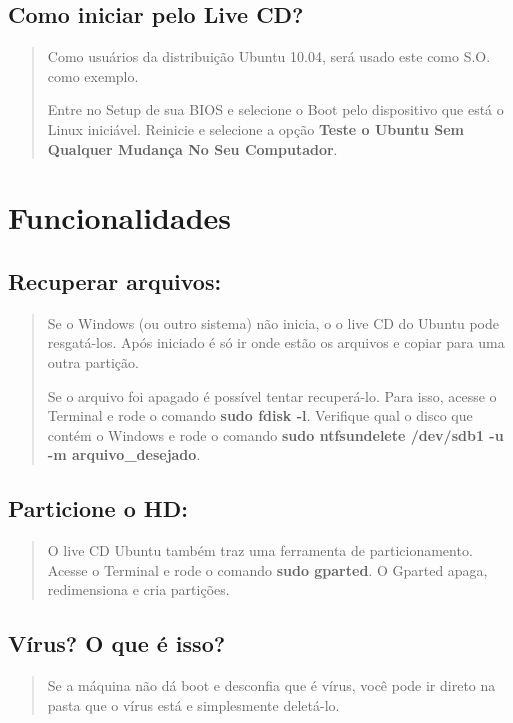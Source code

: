\documentclass[12pt, a4paper, tocpage=plain]{abnt} %
\begin{document}
\section{Como iniciar pelo Live CD?}

\begin{quote}
Como usuários da distribuição Ubuntu 10.04, será usado este como S.O. como exemplo.

Entre no Setup de sua BIOS e selecione o Boot pelo dispositivo que está o Linux iniciável. Reinicie e selecione a opção {\bf Teste o Ubuntu Sem Qualquer Mudança No Seu Computador}.
\end{quote}

\chapter{Funcionalidades}


\section{Recuperar arquivos:}

\begin{quote}
Se o Windows (ou outro sistema) não inicia, o o live CD do Ubuntu pode resgatá-los. Após iniciado é só ir onde estão os arquivos e copiar para uma outra partição. 

Se o arquivo foi apagado é possível tentar recuperá-lo. Para isso, acesse o Terminal e rode o comando  {\bf sudo fdisk -l}. Verifique qual o disco que contém o Windows e rode o comando {\bf sudo ntfsundelete /dev/sdb1 -u -m arquivo\_desejado}.
\end{quote}

\section{Particione o HD:}

\begin{quote}
O live CD Ubuntu também traz uma ferramenta de particionamento. Acesse o Terminal e rode o comando {\bf sudo gparted}. O Gparted apaga, redimensiona e cria partições.
\end{quote}

\section{Vírus? O que é isso?}

\begin{quote}
Se a máquina não dá boot e desconfia que é vírus, você pode ir direto na pasta que o vírus está e simplesmente deletá-lo.
\end{quote}
\end{document}
